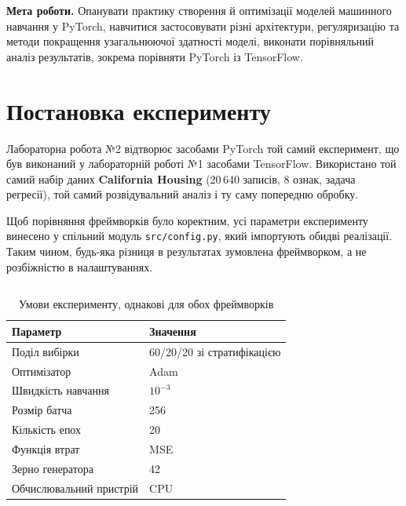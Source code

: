 \documentclass[14pt,a4paper]{extreport}
\begin{document}

\textbf{Мета роботи.} Опанувати практику створення й оптимізації моделей машинного навчання у PyTorch, навчитися застосовувати різні архітектури, регуляризацію та методи покращення узагальнюючої здатності моделі, виконати порівняльний аналіз результатів, зокрема порівняти PyTorch із TensorFlow.

\section{Постановка експерименту}

Лабораторна робота №2 відтворює засобами PyTorch той самий експеримент, що був виконаний у лабораторній роботі №1 засобами TensorFlow. Використано той самий набір даних \textbf{California Housing} (20\,640 записів, 8 ознак, задача регресії), той самий розвідувальний аналіз і ту саму попередню обробку.

Щоб порівняння фреймворків було коректним, усі параметри експерименту винесено у спільний модуль \texttt{src/config.py}, який імпортують обидві реалізації. Таким чином, будь-яка різниця в результатах зумовлена фреймворком, а не розбіжністю в налаштуваннях.

\inputminted{python}{../src/aiit/config.py}
\label{lst:config}

\begin{table}[H]
\caption{Умови експерименту, однакові для обох фреймворків}
\label{tab:setup}
\begin{tabularx}{\linewidth}{|X|l|}
\hline
\textbf{Параметр} & \textbf{Значення} \\
\hline
Поділ вибірки & 60/20/20 зі стратифікацією \\
\hline
Оптимізатор & Adam \\
\hline
Швидкість навчання & $10^{-3}$ \\
\hline
Розмір батча & 256 \\
\hline
Кількість епох & 20 \\
\hline
Функція втрат & MSE \\
\hline
Зерно генератора & 42 \\
\hline
Обчислювальний пристрій & CPU \\
\hline
\end{tabularx}
\end{table}
\end{document}
